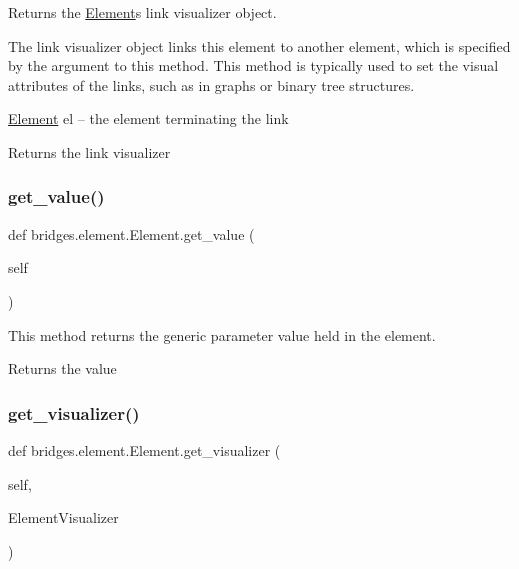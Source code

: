 Returns the \mbox{\hyperlink{classbridges_1_1element_1_1_element}{Element}}\textquotesingle{}s link visualizer object. 

The link visualizer object links this element to another element, which is specified by the argument to this method. This method is typically used to set the visual attributes of the links, such as in graphs or binary tree structures.

\mbox{\hyperlink{classbridges_1_1element_1_1_element}{Element}} el -- the element terminating the link

\begin{DoxyReturn}{Returns}
the link visualizer 
\end{DoxyReturn}
\mbox{\label{classbridges_1_1element_1_1_element_aafcdc6c1661ddbf28e664b69c72ed5a4}} 
\subsubsection{\texorpdfstring{get\+\_\+value()}{get\_value()}}
{\footnotesize\ttfamily def bridges.\+element.\+Element.\+get\+\_\+value (\begin{DoxyParamCaption}\item[{}]{self }\end{DoxyParamCaption})}



This method returns the generic parameter value held in the element. 

\begin{DoxyReturn}{Returns}
the value 
\end{DoxyReturn}
\mbox{\label{classbridges_1_1element_1_1_element_aee2ee2c8445790a6c60f2377964896cb}} 
\subsubsection{\texorpdfstring{get\+\_\+visualizer()}{get\_visualizer()}}
{\footnotesize\ttfamily def bridges.\+element.\+Element.\+get\+\_\+visualizer (\begin{DoxyParamCaption}\item[{}]{self,  }\item[{}]{Element\+Visualizer }\end{DoxyParamCaption})}



